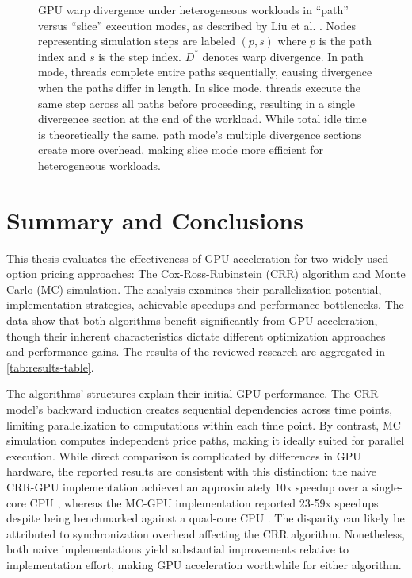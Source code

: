 \documentclass[english,12pt,a4paper,pdftex,sci,utf8]{aaltothesis}
\begin{document}
\begin{figure}[htbp]
\begin{tikzpicture}[
    node distance=0.9cm,
    every node/.style={minimum size=0.8cm, font=\footnotesize, thick, draw=black!70, inner sep=0pt}
]
\end{tikzpicture}
\caption{GPU warp divergence under heterogeneous workloads in ``path'' versus ``slice'' execution modes, as described by Liu et al. \cite{liu2010efficient}. Nodes representing simulation steps are labeled $(p,s)$ where $p$ is the path index and $s$ is the step index. $D^*$ denotes warp divergence. In path mode, threads complete entire paths sequentially, causing divergence when the paths differ in length. In slice mode, threads execute the same step across all paths before proceeding, resulting in a single divergence section at the end of the workload. While total idle time is theoretically the same, path mode's multiple divergence sections create more overhead, making slice mode more efficient for heterogeneous workloads. }

\label{fig:gpu-divergence}
\end{figure}

\section{Summary and Conclusions}  \label{sec:summary-conclusions}
This thesis evaluates the effectiveness of GPU acceleration for two widely used option pricing approaches: The Cox-Ross-Rubinstein (CRR) algorithm and Monte Carlo (MC) simulation. The analysis examines their parallelization potential, implementation strategies, achievable speedups and performance bottlenecks. The data show that both algorithms benefit significantly from GPU acceleration, though their inherent characteristics dictate different optimization approaches and performance gains. The results of the reviewed research are aggregated in \cref{tab:results-table}.

The algorithms' structures explain their initial GPU performance. The CRR model's backward induction creates sequential dependencies across time points, limiting parallelization to computations within each time point. By contrast, MC simulation computes independent price paths, making it ideally suited for parallel execution. While direct comparison is complicated by differences in GPU hardware, the reported results are consistent with this distinction: the naive CRR-GPU implementation achieved an approximately 10x speedup over a single-core CPU \cite{pharr2005gpu}, whereas the MC-GPU implementation reported 23-59x speedups despite being benchmarked against a quad-core CPU \cite{nguyen2007gpu}. The disparity can likely be attributed to synchronization overhead affecting the CRR algorithm. Nonetheless, both naive implementations yield substantial improvements relative to implementation effort, making GPU acceleration worthwhile for either algorithm. 
\end{document}
